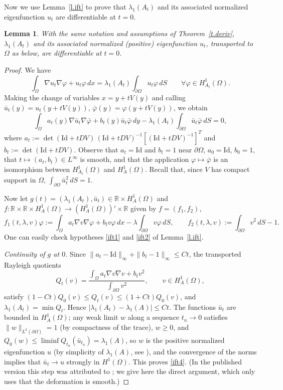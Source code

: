\documentclass[11pt]{amsart}
\newtheorem{lemma}{Lemma}[section]
\theoremstyle{remark}
\numberwithin{equation}{section}
\newcommand{\R}{\mathbb{R}}
\begin{document}
Now we use Lemma~\ref{l.ift} to prove that $\lambda_1(A_t)$ and its associated normalized eigenfunction $u_t$ are differentiable at $t=0$.

\begin{lemma}\label{l.diff}
With the same notation and assumptions of Theorem~\ref{t.deriv}, $\lambda_1(A_t)$ and its associated normalized (positive) eigenfunction $u_t$, transported to $\Omega$ as below, are differentiable at $t=0$.
\end{lemma}

\begin{proof}
We have
\[
\int_\Omega\nabla u_t\nabla\varphi+u_t\varphi\,dx=\lambda_1(A_t)\int_{\partial\Omega}u_t\varphi\,dS\qquad\forall\varphi\in H^1_{A_t}(\Omega).
\]
Making the change of variables $x=y+tV(y)$ and calling $\bar u_t(y)=u_t(y+tV(y))$, $\bar\varphi(y)=\varphi(y+tV(y))$, we obtain
\[
\int_\Omega a_t(y)\nabla\bar u_t\nabla\bar\varphi+b_t(y)\bar u_t\bar\varphi\,dy-\lambda_1(A_t)\int_{\partial\Omega}\bar u_t\bar\varphi\,dS=0,
\]
where $a_t:=\det(\mathrm{Id}+tDV)\,(\mathrm{Id}+tDV)^{-1}[(\mathrm{Id}+tDV)^{-1}]^T$ and $b_t:=\det(\mathrm{Id}+tDV)$. Observe that $a_t=\mathrm{Id}$ and $b_t=1$ near $\partial\Omega$, $a_0=\mathrm{Id}$, $b_0=1$, that $t\mapsto(a_t,b_t)\in L^\infty$ is smooth, and that the application $\varphi\mapsto\bar\varphi$ is an isomorphism between $H^1_{A_t}(\Omega)$ and $H^1_A(\Omega)$. Recall that, since $V$ has compact support in $\Omega$, $\int_{\partial\Omega}\bar u_t^2\,dS=1$.

Now let $g(t)=(\lambda_1(A_t),\bar u_t)\in\R\times H^1_A(\Omega)$ and $f:\R\times\R\times H^1_A(\Omega)\to(H^1_A(\Omega))'\times\R$ given by $f=(f_1,f_2)$,
\[
f_1(t,\lambda,v)\varphi:=\int_\Omega a_t\nabla v\nabla\varphi+b_tv\varphi\,dx-\lambda\int_{\partial\Omega}v\varphi\,dS,\qquad f_2(t,\lambda,v):=\int_{\partial\Omega}v^2\,dS-1.
\]
One can easily check hypotheses \eqref{ift1} and \eqref{ift2} of Lemma~\ref{l.ift}.

\emph{Continuity of $g$ at $0$.} Since $\|a_t-\mathrm{Id}\|_\infty+\|b_t-1\|_\infty\le Ct$, the transported Rayleigh quotients
\[
Q_t(v)=\frac{\int_\Omega a_t\nabla v\nabla v+b_tv^2}{\int_{\partial\Omega}v^2},\qquad v\in H^1_A(\Omega),
\]
satisfy $(1-Ct)Q_0(v)\le Q_t(v)\le(1+Ct)Q_0(v)$, and $\lambda_1(A_t)=\min Q_t$. Hence $|\lambda_1(A_t)-\lambda_1(A)|\le Ct$. The functions $\bar u_t$ are bounded in $H^1_A(\Omega)$; any weak limit $w$ along a sequence $t_n\to0$ satisfies $\|w\|_{L^2(\partial\Omega)}=1$ (by compactness of the trace), $w\ge0$, and $Q_0(w)\le\liminf Q_{t_n}(\bar u_{t_n})=\lambda_1(A)$, so $w$ is the positive normalized eigenfunction $u$ (by simplicity of $\lambda_1(A)$, see \cite{MR}), and the convergence of the norms implies that $\bar u_t\to u$ strongly in $H^1(\Omega)$. This proves \eqref{ift4}. (In the published version this step was attributed to \cite[Theorem~1.6]{FBRW1}; we give here the direct argument, which only uses that the deformation is smooth.)


\end{proof}
\end{document}
